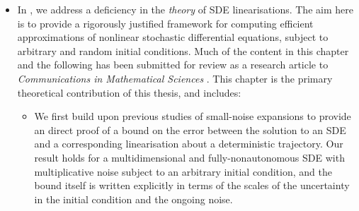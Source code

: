 \begin{itemize}
	\item In , we address a deficiency in the \emph{theory} of SDE linearisations. %
	      The aim here is to provide a rigorously justified framework for computing efficient approximations of nonlinear stochastic differential equations, subject to arbitrary and random initial conditions.
	      Much of the content in this chapter and the following  has been submitted for review as a research article to \emph{Communications in Mathematical Sciences} \citep{BlakeEtAl_2023_ConvergenceStochasticDifferential}.
	      This chapter is the primary theoretical contribution of this thesis, and includes:

	      \begin{itemize}
		      \item We first build upon previous studies of small-noise expansions \citep{Sanz-AlonsoStuart_2017_GaussianApproximationsSmall,Blagoveshchenskii_1962_DiffusionProcessesDepending,FreidlinWentzell_1998_RandomPerturbationsDynamical} to provide an direct proof of a bound on the error between the solution to an SDE and a corresponding linearisation about a deterministic trajectory.
		            Our result holds for a multidimensional and fully-nonautonomous SDE with multiplicative noise subject to an arbitrary initial condition, and the bound itself is written explicitly in terms of the scales of the uncertainty in the initial condition and the ongoing noise.




\end{itemize}
\end{itemize}
